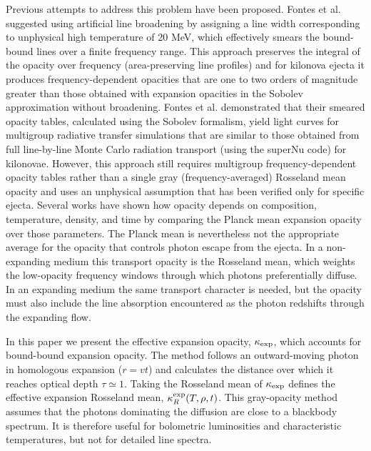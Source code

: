 \documentclass[final,5p,times,twocolumn]{elsarticle}
\begin{document}
    Previous attempts to address this problem have been proposed. Fontes et al. \cite{fontes2015opacity,fontes2017linesmeared}
    suggested using artificial 
    line broadening by assigning a line width corresponding to unphysical high temperature of 20 MeV, 
    which effectively smears the bound-bound lines 
    over a finite frequency range. This approach preserves the integral of the opacity over
    frequency (area-preserving line profiles) and for kilonova ejecta it  
    produces frequency-dependent opacities that are one to two orders of magnitude greater than those
    obtained with expansion opacities in 
    the Sobolev approximation without broadening. Fontes et al. \cite{fontes2020opacity} demonstrated that
    their smeared opacity tables, 
    calculated using the Sobolev formalism, yield light curves for multigroup radiative transfer simulations
    that are similar to those 
    obtained from full line-by-line Monte Carlo radiation transport (using the superNu code) for kilonovae.
    However, this approach still requires multigroup frequency-dependent opacity tables rather than
    a single gray (frequency-averaged) Rosseland mean opacity and uses an unphysical assumption that
    has been verified only for specific ejecta.
    Several works \cite{deprince2024kilonova,just2022properties,tanaka2020systematic} have shown how opacity depends on composition,
    temperature, density, and time by comparing the Planck mean expansion opacity over those parameters.
    The Planck mean is nevertheless not the appropriate average for the opacity that controls photon
    escape from the ejecta. In a non-expanding medium this transport opacity is the Rosseland mean,
    which weights the low-opacity frequency windows through which photons preferentially diffuse.
    In an expanding medium the same transport character is needed, but the opacity must also include
    the line absorption encountered as the photon redshifts through the expanding flow.

    In this paper we present the effective expansion opacity, $\kappa_{\rm exp}$, which accounts for
    bound-bound expansion opacity. The method follows an outward-moving photon in homologous expansion
    ($r=vt$) and calculates the distance over which it reaches optical depth $\tau\simeq1$.
    Taking the Rosseland mean of $\kappa_{\rm exp}$ defines the effective expansion Rosseland mean,
    $\kappa_R^{\rm exp}(T,\rho,t)$.
    This gray-opacity method assumes that the photons dominating the diffusion are close to a
    blackbody spectrum. It is therefore useful for bolometric luminosities and characteristic
    temperatures, but not for detailed line spectra.
\end{document}
